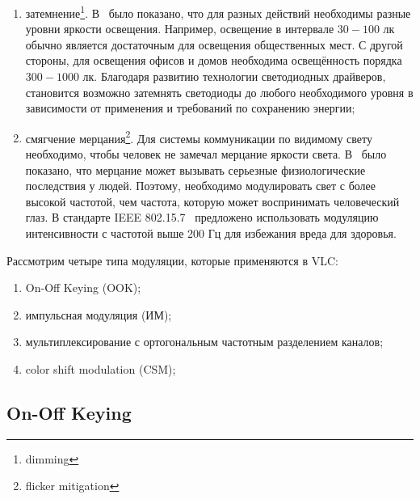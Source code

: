 \begin{enumerate}
    \item затемнение\footnote{dimming}. В~\cite{Zukauskas2002} было показано, что для разных действий необходимы разные уровни яркости освещения. Например, освещение в интервале $30-100$ лк обычно является достаточным для освещения общественных мест. С другой стороны, для освещения офисов и домов необходима освещённость порядка $300-1000$ лк. Благодаря развитию технологии светодиодных драйверов, становится возможно затемнять светодиоды до любого необходимого уровня в зависимости от применения и требований по сохранению энергии;
    \item смягчение мерцания\footnote{flicker mitigation}. Для системы коммуникации по видимому свету необходимо, чтобы человек не замечал мерцание яркости света. В~\cite{Berman1991} было показано, что мерцание может вызывать серьезные физиологические последствия у людей. Поэтому, необходимо модулировать свет с более высокой частотой, чем частота, которую может воспринимать человеческий глаз. В стандарте IEEE 802.15.7~\cite{IEEE2018} предложено использовать модуляцию интенсивности с частотой выше 200 Гц для избежания вреда для здоровья. 
\end{enumerate}

Рассмотрим четыре типа модуляции, которые применяются в VLC: 


\begin{enumerate}
    \item On-Off Keying (OOK);
    \item импульсная модуляция (ИМ);
    \item мультиплексирование с ортогональным частотным разделением каналов;
    \item color shift modulation (CSM);
\end{enumerate}

\subsection{On-Off Keying}



